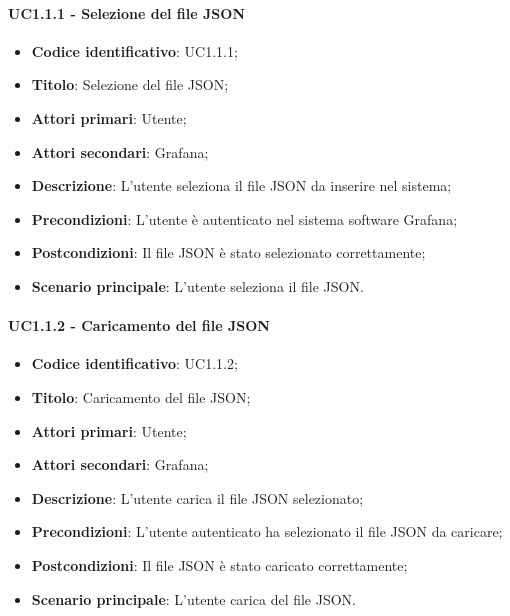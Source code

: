 \paragraph{UC1.1.1 - Selezione del file JSON}
\begin{itemize}
	\item \textbf{Codice identificativo}: UC1.1.1;
	\item \textbf{Titolo}: Selezione del file JSON;
	\item \textbf{Attori primari}: Utente;
	\item \textbf{Attori secondari}: Grafana\glo;
	\item \textbf{Descrizione}: L'utente seleziona il file JSON da inserire nel sistema;
	\item \textbf{Precondizioni}: L'utente è autenticato nel sistema software Grafana\glo;
	\item \textbf{Postcondizioni}: Il file JSON è stato selezionato correttamente;
	\item \textbf{Scenario principale}: L'utente seleziona il file JSON.
\end{itemize}

\paragraph{UC1.1.2 - Caricamento del file JSON}
\begin{itemize}
	\item \textbf{Codice identificativo}: UC1.1.2;
	\item \textbf{Titolo}: Caricamento del file JSON;
	\item \textbf{Attori primari}: Utente;
	\item \textbf{Attori secondari}: Grafana\glo;
	\item \textbf{Descrizione}: L'utente carica il file JSON selezionato;
	\item \textbf{Precondizioni}: L'utente autenticato ha selezionato il file JSON da caricare;
	\item \textbf{Postcondizioni}: Il file JSON è stato caricato correttamente;
	\item \textbf{Scenario principale}: L'utente carica del file JSON.
\end{itemize}

